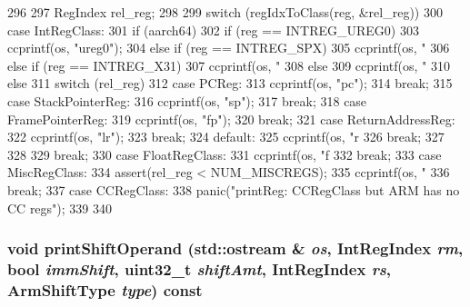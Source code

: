 \begin{DoxyCode}
296 {
297     RegIndex rel_reg;
298 
299     switch (regIdxToClass(reg, &rel_reg)) {
300       case IntRegClass:
301         if (aarch64) {
302             if (reg == INTREG_UREG0)
303                 ccprintf(os, "ureg0");
304             else if (reg == INTREG_SPX)
305                ccprintf(os, "%
306             else if (reg == INTREG_X31)
307                 ccprintf(os, "%
308             else
309                 ccprintf(os, "%
310         } else {
311             switch (rel_reg) {
312               case PCReg:
313                 ccprintf(os, "pc");
314                 break;
315               case StackPointerReg:
316                 ccprintf(os, "sp");
317                 break;
318               case FramePointerReg:
319                 ccprintf(os, "fp");
320                 break;
321               case ReturnAddressReg:
322                 ccprintf(os, "lr");
323                 break;
324               default:
325                 ccprintf(os, "r%
326                 break;
327             }
328         }
329         break;
330       case FloatRegClass:
331         ccprintf(os, "f%
332         break;
333       case MiscRegClass:
334         assert(rel_reg < NUM_MISCREGS);
335         ccprintf(os, "%
336         break;
337       case CCRegClass:
338         panic("printReg: CCRegClass but ARM has no CC regs\n");
339     }
340 }
\end{DoxyCode}
\hypertarget{classArmISA_1_1ArmStaticInst_aadac34271bfa06cdbf005536896b4a63}{
\subsubsection[{printShiftOperand}]{\setlength{\rightskip}{0pt plus 5cm}void printShiftOperand (std::ostream \& {\em os}, \/  {\bf IntRegIndex} {\em rm}, \/  bool {\em immShift}, \/  {\bf uint32\_\-t} {\em shiftAmt}, \/  {\bf IntRegIndex} {\em rs}, \/  {\bf ArmShiftType} {\em type}) const}}
\label{classArmISA_1_1ArmStaticInst_aadac34271bfa06cdbf005536896b4a63}



